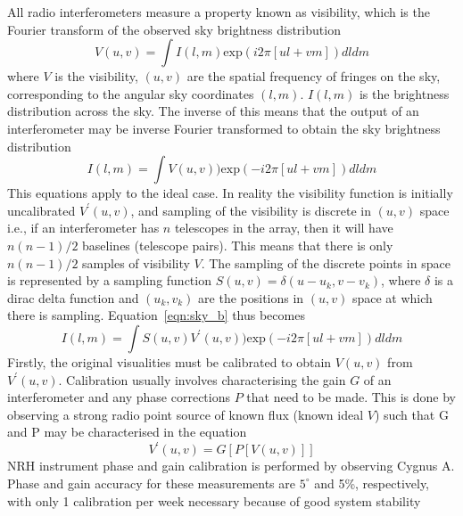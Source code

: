 All radio interferometers measure a property known as visibility, which is the Fourier transform of the observed sky brightness distribution
\begin{equation}
V(u,v)=\int I(l,m)\mathrm{exp}(i2\pi[ul +vm])dldm
\end{equation}
where $V$ is the visibility, $(u,v)$ are the spatial frequency of fringes on the sky, corresponding to the angular sky coordinates $(l,m)$. $I(l,m)$ is the brightness distribution across the sky. The inverse of this means that the output of an interferometer may be inverse Fourier transformed to obtain the sky brightness distribution
\begin{equation}
I(l,m)=\int V(u,v))\mathrm{exp}(-i2\pi[ul +vm])dldm
\label{eqn:sky_b}
\end{equation}
This equations apply to the ideal case. In reality the visibility function is initially uncalibrated $V^{'}(u,v)$, and sampling of the visibility is discrete in $(u,v)$ space i.e., if an interferometer has $n$ telescopes in the array, then it will have $n(n-1)/2$ baselines (telescope pairs). This means that there is only $n(n-1)/2$ samples of visibility $V$. The sampling of the discrete points in space is represented by a sampling function $S(u,v) = \delta(u-u_k, v-v_k)$, where $\delta$ is a dirac delta function and $(u_k, v_k)$ are the positions in $(u, v)$ space at which there is sampling. Equation~\ref{eqn:sky_b} thus becomes
\begin{equation}
I(l,m)=\int S(u,v)V^{'}(u,v))\mathrm{exp}(-i2\pi[ul +vm])dldm
\label{eqn:VS}
\end{equation}
Firstly, the original visualities must be calibrated to obtain $V(u,v)$ from $V^{'}(u,v)$. Calibration usually involves characterising the gain $G$ of an interferometer and any phase corrections $P$ that need to be made. This is done by observing a strong radio point source of known flux (known ideal $V$) such that G and P may be characterised in the equation
\begin{equation}
V^{'}(u,v) = G[ P[V(u,v)] ]
\end{equation}
NRH instrument phase and gain calibration is performed by observing Cygnus A. Phase and gain accuracy for these measurements are $5^{\circ}$ and 5\%, respectively, with only 1 calibration per week necessary because of good system stability \citep{avignon1989}

